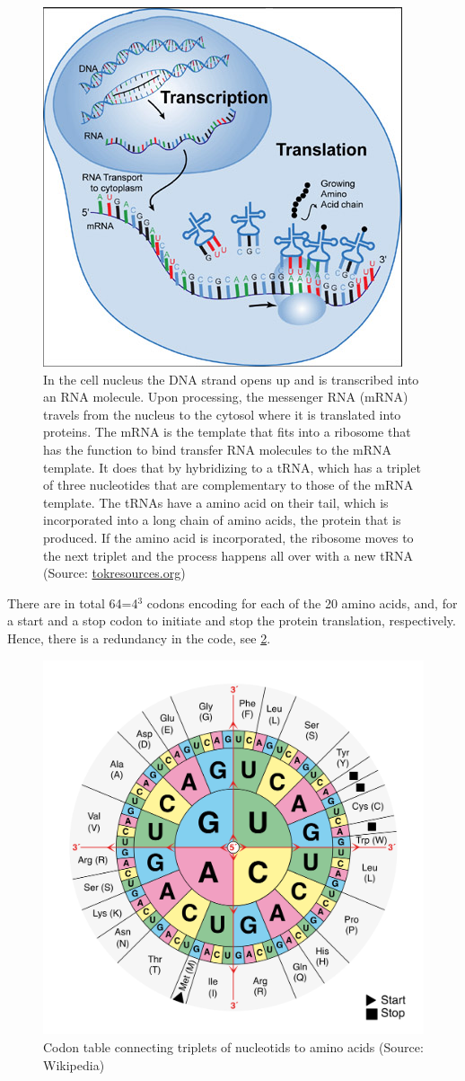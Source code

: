 \documentclass[
  11pt,
]{book}
\begin{document}
\begin{figure}

{\centering \includegraphics[width=0.5\linewidth]{./figs/transcription_2} 

}

\caption{In the cell nucleus the DNA strand opens up and is transcribed into an RNA molecule. Upon processing, the messenger RNA (mRNA) travels from the nucleus to the cytosol where it is translated into proteins. The mRNA is the template that fits into a ribosome that has the function to bind transfer RNA molecules to the mRNA template. It does that by hybridizing to a tRNA, which has a triplet of three nucleotides that are complementary to those of the mRNA template. The tRNAs have a amino acid on their tail, which is incorporated into a long chain of amino acids, the protein that is produced. If the amino acid is incorporated, the ribosome moves to the next triplet and the process happens all over with a new tRNA (Source: \href{http://www.tokresource.org/tok_classes/biobiobio/biomenu/transcription_translation/}{tokresources.org})}\label{fig:transcriptionTranslation}
\end{figure}

There are in total 64=4\(^3\) codons encoding for each of the 20 amino acids, and, for a start and a stop codon to initiate and stop the protein translation, respectively. Hence, there is a redundancy in the code, see \ref{fig:codonTable}.

\begin{figure}

{\centering \includegraphics[width=0.5\linewidth]{./figs/Aminoacids_table} 

}

\caption{Codon table connecting triplets of nucleotids to amino acids (Source: Wikipedia)}\label{fig:codonTable}
\end{figure}
\end{document}

